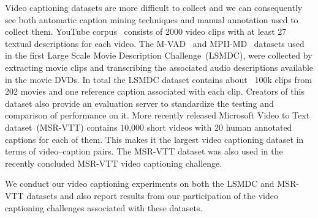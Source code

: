Video captioning datasets are more difficult to collect and we can consequently
see both automatic caption mining techniques and manual annotation used to
collect them.
YouTube corpus~\cite{chen2011collecting} consists of 2000 video clips with
at least 27 textual descriptions for each video.
The M-VAD~\cite{rohrbach15cvpr} and MPII-MD~\cite{AtorabiM-VAD2015} datasets
used in the first Large Scale Movie Description Challenge~(LSMDC), were
collected by extracting movie clips and transcribing the associated audio
descriptions available in the movie DVDs.
In total the LSMDC dataset contains about ~100k clips from 202 movies and one
reference caption associated with each clip. 
Creators of this dataset also provide an evaluation server to standardize the
testing and comparison of performance on it.
More recently released Microsoft Video to Text dataset~(MSR-VTT) contains 10,000
short videos with 20 human annotated captions for each of them. 
This makes it the largest video captioning dataset in terms of video--caption
pairs.
The MSR-VTT dataset was also used in the recently concluded MSR-VTT video captioning
challenge.

We conduct our video captioning experiments on both the LSMDC and MSR-VTT
datasets and also report results from our participation of the video captioning
challenges associated with these datasets. 

